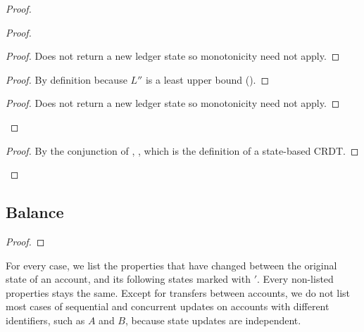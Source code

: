 \documentclass[9pt, oneside]{article}   	%
\begin{document}
\begin{proof}
\begin{proof}
		\begin{proof}
			Does not return a new ledger state so monotonicity need not apply.
		\end{proof}
			
		\begin{proof}
		 	By definition because $L''$ is a least upper bound ().
		\end{proof}
			
		\begin{proof}
			Does not return a new ledger state so monotonicity need not apply.
		\end{proof}

	\end{proof}

	
	\qedstep
	\begin{proof}
		By the conjunction of , ,  which is the definition of a state-based CRDT.
	\end{proof}
\end{proof}

\subsection{Balance}
\label{sec:proof:balance}

\begin{proof}
\end{proof}

For every case, we list the properties that have changed between the original state of an account, and its following states marked with $'$. Every non-listed properties stays the same. Except for transfers between accounts, we do not list most cases of sequential and concurrent updates on accounts with different identifiers, such as $A$ and $B$, because state updates are independent.
\end{document}
